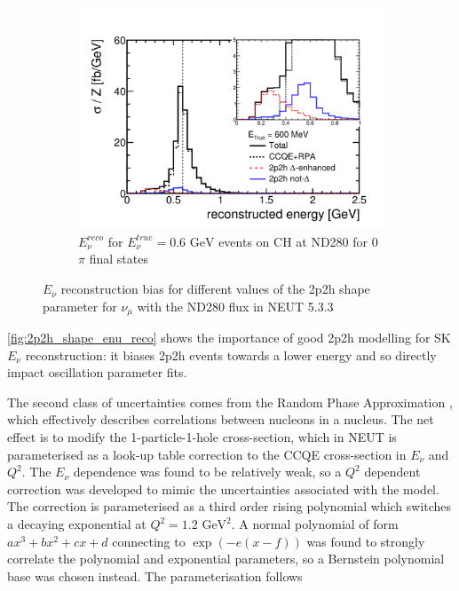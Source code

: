 \begin{figure}[h]
\begin{subfigure}[t]{0.42\textwidth}
	\includegraphics[width=\textwidth, trim={20mm 10mm 25mm 40mm}, clip,page=1]{figures/niwg/delta_notdelta}
	\caption{$E_\nu^{reco}$ for $E_\nu^{true}=0.6\text{ GeV}$ events on CH at ND280 for 0$\pi$ final states}
	\label{fig:2p2h_shape_enu_reco}
\end{subfigure}
	\caption{$E_\nu$ reconstruction bias for different values of the 2p2h shape parameter for $\nu_\mu$ with the ND280 flux in NEUT 5.3.3}
	\label{fig:2p2h_shape_enu}
\end{figure}

\autoref{fig:2p2h_shape_enu_reco} shows the importance of good 2p2h modelling for SK $E_\nu$ reconstruction: it biases 2p2h events towards a lower energy and so directly impact oscillation parameter fits.

The second class of uncertainties comes from the Random Phase Approximation \cite{nieves2}, which effectively describes correlations between nucleons in a nucleus. The net effect is to modify the 1-particle-1-hole\cite{nieves1} cross-section, which in NEUT is parameterised as a look-up table correction to the CCQE cross-section in $E_\nu$ and $Q^2$. The $E_\nu$ dependence was found to be relatively weak, so a $Q^2$ dependent correction was developed to mimic the uncertainties associated with the model\cite{nieves1}. The correction is parameterised as a third order rising polynomial which switches a decaying exponential at $Q^2=1.2\text{ GeV}^2$. A normal polynomial of form $ax^3+bx^2+cx+d$ connecting to $\exp{\left(-e(x-f)\right)}$ was found to strongly correlate the polynomial and exponential parameters, so a Bernstein polynomial base was chosen instead. The parameterisation follows

